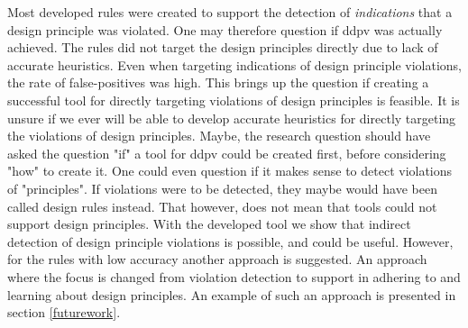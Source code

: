 \documentclass{report}
\begin{document}
Most developed rules were created to support the detection of \textit{indications} that a design principle was violated. One may therefore question if \gls{ddpv} was actually achieved. The rules did not target the design principles directly due to lack of accurate heuristics. Even when targeting indications of design principle violations, the rate of false-positives was high. This brings up the question if creating a successful tool for directly targeting violations of design principles is feasible. It is unsure if we ever will be able to develop accurate heuristics for directly targeting the violations of design principles. Maybe, the research question should have asked the question "if" a tool for \gls{ddpv} could be created first, before considering "how" to create it. One could even question if it makes sense to detect violations of "principles". If violations were to be detected, they maybe would have been called design rules instead. That however, does not mean that tools could not support design principles. With the developed tool we show that indirect detection of design principle violations is possible, and could be useful. However, for the rules with low accuracy another approach is suggested. An approach where the focus is changed from violation detection to support in adhering to and learning about design principles. An example of such an approach is presented in section \ref{futurework}.


\end{document}
